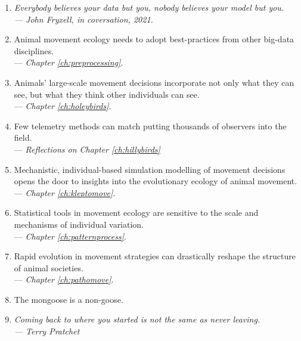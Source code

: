 \begin{onehalfspace}
    \begin{enumerate}
        \item \textit{Everybody believes your data but you, nobody believes your model but you.\\ --- John Fryxell, in coversation, 2021.}

        \item Animal movement ecology needs to adopt best-practices from other big-data disciplines.\\ --- \textit{Chapter \ref{ch:preprocessing}}.

        \item Animals' large-scale movement decisions incorporate not only what they can see, but what they think other individuals can see.\\ --- \textit{Chapter \ref{ch:holeybirds}}.
        
        \item Few telemetry methods can match putting thousands of observers into the field.\\ --- \textit{Reflections on Chapter \ref{ch:hillybirds}}

        \item Mechanistic, individual-based simulation modelling of movement decisions opens the door to insights into the evolutionary ecology of animal movement. \\ --- \textit{Chapter \ref{ch:kleptomove}}.

        \item Statistical tools in movement ecology are sensitive to the scale and mechanisms of individual variation.\\ --- \textit{Chapter \ref{ch:patternprocess}}.

        \item Rapid evolution in movement strategies can drastically reshape the structure of animal societies.\\ --- \textit{Chapter \ref{ch:pathomove}}.
        
        \item The mongoose is a non-goose.

        \item \textit{Coming back to where you started is not the same as never leaving.\\--- Terry Pratchet}
    \end{enumerate}

\end{onehalfspace}

\endgroup

\vfill

\clearpage
